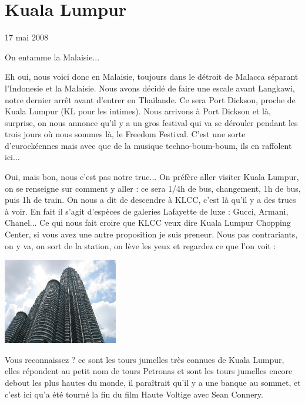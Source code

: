 \section{Kuala Lumpur}

17 mai 2008

\begin{multicols}{2}

On entamme la Malaisie...

Eh oui, nous voici donc en Malaisie, toujours dans le détroit de Malacca séparant l'Indonesie et la Malaisie. Nous avons décidé de faire une escale avant Langkawi, notre dernier arrêt avant d'entrer en Thaïlande. Ce sera Port Dickson, proche de Kuala Lumpur (KL pour les intimes). Nous arrivons à Port Dickson et là, surprise, on nous annonce qu'il y a un gros festival qui va se dérouler pendant les trois jours où nous sommes là, le Freedom Festival. C'est une sorte d'eurockéennes mais avec que de la musique techno-boum-boum, ils en raffolent ici...

Oui, mais bon, nous c'est pas notre truc... On préfère aller visiter Kuala Lumpur, on se renseigne sur comment y aller : ce sera 1/4h de bus, changement, 1h de bus, puis 1h de train. On nous a dit de descendre à KLCC, c'est là qu'il y a des trucs à voir. En fait il s'agit d'espèces de galeries Lafayette de luxe : Gucci, Armani, Chanel... Ce qui nous fait croire que KLCC veux dire Kuala Lumpur Chopping Center, si vous avez une autre proposition je suis preneur. Nous pas contrariants, on y va, on sort de la station, on lève les yeux et regardez ce que l'on voit :

\smallbreak
\hspace*{-0.65cm}
\includegraphics[width=5cm]{articles/Kuala-lumpur/1210432312E0e6.jpg}
\smallbreak

Vous reconnaissez ? ce sont les tours jumelles très connues de Kuala Lumpur, elles répondent au petit nom de tours Petronas et sont les tours jumelles encore debout les plus hautes du monde, il paraîtrait qu'il y a une banque au sommet, et c'est ici qu'a été tourné la fin du film Haute Voltige avec Sean Connery.


\end{multicols}

